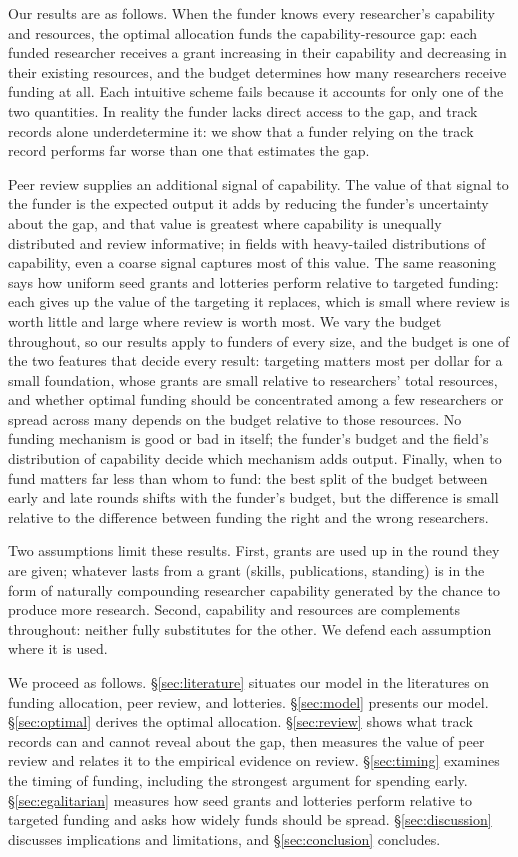 \documentclass[article, 11pt, reqno]{amsart}
\theoremstyle{named}
\begin{document}
Our results are as follows. When the funder knows every researcher's capability and resources, the optimal allocation funds the capability-resource gap: each funded researcher receives a grant increasing in their capability and decreasing in their existing resources, and the budget determines how many researchers receive funding at all. Each intuitive scheme fails because it accounts for only one of the two quantities. In reality the funder lacks direct access to the gap, and track records alone underdetermine it: we show that a funder relying on the track record performs far worse than one that estimates the gap.

Peer review supplies an additional signal of capability. The value of that signal to the funder is the expected output it adds by reducing the funder's uncertainty about the gap, and that value is greatest where capability is unequally distributed and review informative; in fields with heavy-tailed distributions of capability, even a coarse signal captures most of this value. The same reasoning says how uniform seed grants and lotteries perform relative to targeted funding: each gives up the value of the targeting it replaces, which is small where review is worth little and large where review is worth most. We vary the budget throughout, so our results apply to funders of every size, and the budget is one of the two features that decide every result: targeting matters most per dollar for a small foundation, whose grants are small relative to researchers' total resources, and whether optimal funding should be concentrated among a few researchers or spread across many depends on the budget relative to those resources. No funding mechanism is good or bad in itself; the funder's budget and the field's distribution of capability decide which mechanism adds output. Finally, when to fund matters far less than whom to fund: the best split of the budget between early and late rounds shifts with the funder's budget, but the difference is small relative to the difference between funding the right and the wrong researchers.

Two assumptions limit these results. First, grants are used up in the round they are given; whatever lasts from a grant (skills, publications, standing) is in the form of naturally compounding researcher capability generated by the chance to produce more research. Second, capability and resources are complements throughout: neither fully substitutes for the other. We defend each assumption where it is used.

We proceed as follows. \S\ref{sec:literature} situates our model in the literatures on funding allocation, peer review, and lotteries. \S\ref{sec:model} presents our model. \S\ref{sec:optimal} derives the optimal allocation. \S\ref{sec:review} shows what track records can and cannot reveal about the gap, then measures the value of peer review and relates it to the empirical evidence on review. \S\ref{sec:timing} examines the timing of funding, including the strongest argument for spending early. \S\ref{sec:egalitarian} measures how seed grants and lotteries perform relative to targeted funding and asks how widely funds should be spread. \S\ref{sec:discussion} discusses implications and limitations, and \S\ref{sec:conclusion} concludes.
\end{document}
